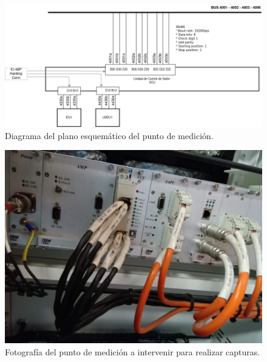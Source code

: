 \documentclass[
11pt, %
]{charter}
\begin{document}
\begin{figure}[htpb]
\centering 
\includegraphics[width=1\textwidth]{./Pics/RedPIDS.drawio.png}
\caption{Diagrama del plano esquemático del punto de medición.}
\label{fig:test point SCU-PIDS diagram}
\end{figure}


\begin{figure}[htpb]
\centering 
\includegraphics[width=1\textwidth]{./Pics/IMG_20210322_122403.jpg}
\caption{Fotografía del punto de medición a intervenir para realizar capturas.}
\label{fig:NOsniffingPhoto}
\end{figure}
\end{document}
